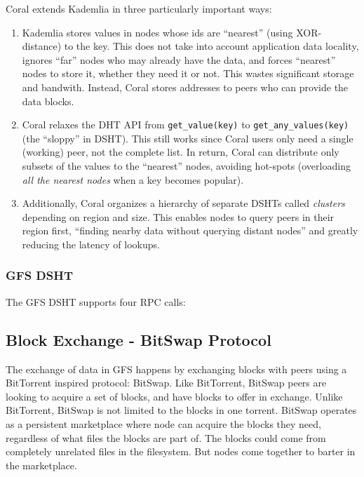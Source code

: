 \documentclass{sig-alternate}
\begin{document}
Coral extends Kademlia in three particularly important ways:

\begin{enumerate}

  \item Kademlia stores values in nodes whose ids are ``nearest'' (using
        XOR-distance) to the key. This does not take into account application
        data locality, ignores ``far'' nodes who may already have the data, and
        forces ``nearest'' nodes to store it, whether they need it or not.
        This wastes significant storage and bandwith. Instead, Coral stores
        addresses to peers who can provide the data blocks.

  \item Coral relaxes the DHT API from \texttt{get\_value(key)} to
        \texttt{get\_any\_values(key)} (the ``sloppy'' in DSHT).
        This still works since Coral users only need a single (working) peer,
        not the complete list. In return, Coral can distribute only subsets of
        the values to the ``nearest'' nodes, avoiding hot-spots (overloading
        \textit{all the nearest nodes} when a key becomes popular).

  \item Additionally, Coral organizes a hierarchy of separate DSHTs called
        \textit{clusters} depending on region and size. This enables nodes to
        query peers in their region first, ``finding nearby data without
        querying distant nodes'' and greatly reducing the latency of
        lookups.

\end{enumerate}


\subsubsection{GFS DSHT}

The GFS DSHT supports four RPC calls:



\subsection{Block Exchange - BitSwap Protocol}

The exchange of data in GFS happens by exchanging blocks with peers using a
BitTorrent inspired protocol: BitSwap. Like BitTorrent, BitSwap peers are
looking to acquire a set of blocks, and have blocks to offer in exchange.
Unlike BitTorrent, BitSwap is not limited to the blocks in one torrent.
BitSwap operates as a persistent marketplace where node can acquire the
blocks they need, regardless of what files the blocks are part of. The
blocks could come from completely unrelated files in the filesystem.
But nodes come together to barter in the marketplace.
\end{document}
